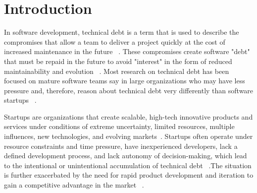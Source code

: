 \documentclass[manuscript]{acmart}
\begin{document}
\maketitle

\section{Introduction}
In software development, technical debt is a term that is used to describe the compromises that allow a team to deliver a project quickly at the cost of increased maintenance in the future ~\cite{Maldonado7332619}. These compromises create software "debt" that must be repaid in the future to  avoid "interest" in the form of reduced maintainability and evolution ~\cite{Seaman6225999}. Most research on technical debt has been focused on mature software teams say in large organizations who may have less pressure and, therefore, reason about technical debt very differently than software startups ~\cite{Besker2018,Li:2015}.

Startups are organizations that create scalable, high-tech innovative products and services under conditions of extreme uncertainty, limited resources, multiple influences, new technologies, and evolving markets~\cite{Unterkalmsteiner16,Sutton854066}. Startups often operate under resource constraints and time pressure, have inexperienced developers, lack a defined development process, and lack autonomy of decision-making, which lead to the intentional or unintentional accumulation of technical debt ~\cite{Besker2018}.The situation is further exacerbated by the need for rapid product development and iteration to gain a competitive advantage in the market ~\cite{Cico0JNM20}.
\end{document}
